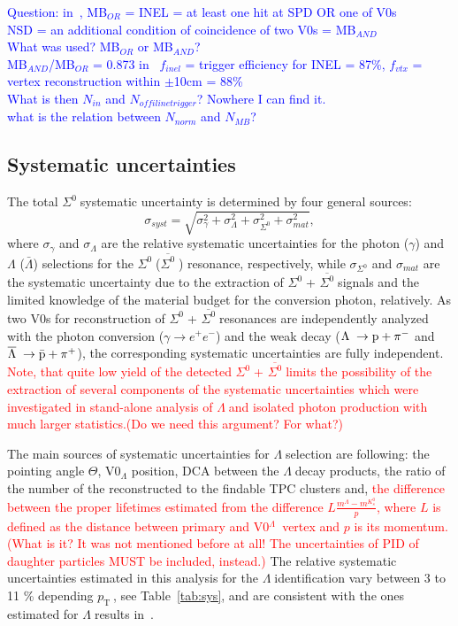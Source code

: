 \documentclass[ALICE,manyauthors]{cernphprep}
\newcommand{\sig}{\ensuremath{\Sigma^0  \; }}
\newcommand{\asig}{\ensuremath{\overline{\Sigma^0} \; }}
\newcommand{\lam}{\ensuremath{\Lambda \; }}
\newcommand{\alam}{\ensuremath{\overline{\Lambda} \; }}
\newcommand{\pt}{\ensuremath{p_{\mathrm{T}\; }}}
\newcommand{\red}{\textcolor{red}}
\newcommand{\blue}{\textcolor{blue}}
\begin{document}
\blue{Question: 
in~\cite{cite:ALICE2015-InclPhot-pp}, MB$_{OR}$ = INEL = at least one hit at SPD OR one of V0s\\
NSD = an additional condition of coincidence of two V0s = MB$_{AND}$\\
What was used? MB$_{OR}$ or MB$_{AND}$? \\
MB$_{AND}$/MB$_{OR}$ = 0.873
in~\cite{cite:NSD, cite:Xi_c} $f_{inel}$ = trigger efficiency for INEL = 87\%, $f_{vtx}$ = vertex reconstruction within $\pm$10cm = 88\%\\
What is then $N_{in}$ and $N_{offilinetrigger}$? Nowhere I can find it.\\
what is the relation between $N_{norm}$ and $N_{MB}$?}

 \subsection{Systematic uncertainties} 

\label{subsec:systematics}

The total \sig systematic uncertainty is determined by four general sources: 
\begin{equation}
 \sigma_{syst} = \sqrt{ \sigma_{\gamma}^2 + \sigma_{\Lambda}^2 + \sigma_{\Sigma^0}^2  + \sigma_{mat}^2 },
 \label{eq:systematic}
\end{equation}
where $\sigma_{\gamma}$ and $\sigma_{\Lambda}$ are the relative systematic uncertainties for the photon ($\gamma$) 
and $\Lambda$ ($\bar{\Lambda}$) selections for the \sig (\asig) resonance, respectively, while $\sigma_{\Sigma^0}$ 
and  $\sigma_{mat}$ are the systematic uncertainty due to the extraction of \sig + \asig signals and the limited 
knowledge of the material budget for the conversion photon, relatively. As two V0s for reconstruction of 
\sig + \asig resonances are independently analyzed with the photon conversion ($\gamma \to e^+ e^-$) and 
the weak decay ($\lam \to  \rm{p} + \pi^-$ and $\alam \to \rm{\bar{p}} + \pi^+$), the corresponding systematic 
uncertainties are fully independent. \red{Note, that quite low yield of the detected \sig + \asig limits the possibility 
of the extraction of several components of the systematic uncertainties which were investigated in
stand-alone analysis of \lam and isolated photon production with much larger statistics.(Do we need this argument? For what?)}

The main sources of systematic uncertainties for \lam selection are following:
the pointing angle $\Theta$, V0$_{\Lambda}$ position, DCA between the \lam decay products, the ratio of 
 the number of the reconstructed to the findable TPC clusters and, \red{the difference between 
 the proper lifetimes estimated from the difference $L \frac{m^{\Lambda} - m^{K^0_s}}{p}$,
where $L$ is defined as the distance between primary and  V0$^{\lam}$ vertex and
$p$ is its momentum.(What is it? It was not mentioned before at all! The uncertainties of 
PID of daughter particles MUST be included, instead.)}
The relative systematic uncertainties estimated in this analysis for the \lam identification 
vary between 3 to 11 \% depending \pt, see Table~\ref{tab:sys}, and are consistent
with the ones estimated for \lam results in~\cite{cite:DDChin-Lam,cite:lambda_pp}.
\end{document}
